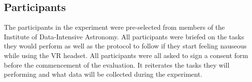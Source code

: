 \subsection{Participants}

The participants in the experiment were pre-selected from members of the Institute of Data-Intensive Astronomy. 
All participants were briefed on the tasks they would perform as well as the protocol to follow if they start feeling nauseous while using the VR headset.
All participants were all asked to sign a consent form before the commencement of the evaluation. 
It reiterates the tasks they will performing and what data will be collected during the experiment.

